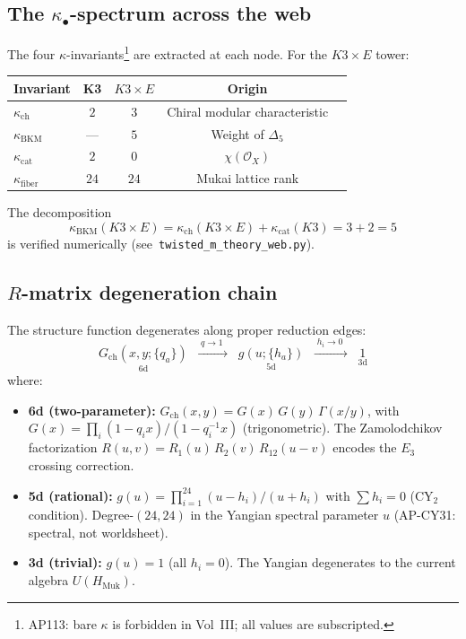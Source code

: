 \subsection{The $\kappa_\bullet$-spectrum across the web}
\label{sec:kappa-spectrum-web}

The four $\kappa$-invariants\footnote{AP113: bare $\kappa$ is forbidden
in Vol~III; all values are subscripted.} are extracted at each node.
For the $K3 \times E$ tower:

\begin{center}
\renewcommand{\arraystretch}{1.3}
\begin{tabular}{lcccc}
\hline
\textbf{Invariant} & \textbf{K3} & \textbf{$K3 \times E$} & \textbf{Origin} \\
\hline
$\kappa_{\mathrm{ch}}$ & $2$ & $3$ & Chiral modular characteristic \\
$\kappa_{\mathrm{BKM}}$ & --- & $5$ & Weight of $\Delta_5$ \\
$\kappa_{\mathrm{cat}}$ & $2$ & $0$ & $\chi(\mathcal{O}_X)$ \\
$\kappa_{\mathrm{fiber}}$ & $24$ & $24$ & Mukai lattice rank \\
\hline
\end{tabular}
\end{center}

\noindent
The decomposition
\begin{equation}
\label{eq:kappa-bkm-decomposition}
  \kappa_{\mathrm{BKM}}(K3 \times E)
    = \kappa_{\mathrm{ch}}(K3 \times E) + \kappa_{\mathrm{cat}}(K3)
    = 3 + 2 = 5
\end{equation}
is verified numerically (see~\texttt{twisted\_m\_theory\_web.py}).

\subsection{$R$-matrix degeneration chain}
\label{sec:rmatrix-degeneration}

The structure function degenerates along proper reduction edges:
\[
  \underset{6\text{d}}{G_{\mathrm{ch}}(x,y;\{q_a\})}
  \;\;\xrightarrow{\;q\to 1\;\;}\;\;
  \underset{5\text{d}}{g(u;\{h_a\})}
  \;\;\xrightarrow{\;h_i\to 0\;\;}\;\;
  \underset{3\text{d}}{1}
\]
where:
\begin{itemize}
\item \textbf{6d (two-parameter):} $G_{\mathrm{ch}}(x,y) = G(x)\,G(y)\,\Gamma(x/y)$,
  with $G(x) = \prod_{i}(1-q_ix)/(1-q_i^{-1}x)$ (trigonometric).
  The Zamolodchikov factorization
  $R(u,v) = R_1(u)\,R_2(v)\,R_{12}(u-v)$
  encodes the $E_3$ crossing correction.
\item \textbf{5d (rational):} $g(u) = \prod_{i=1}^{24}(u - h_i)/(u + h_i)$
  with $\sum h_i = 0$ (CY$_2$ condition).
  Degree-$(24,24)$ in the Yangian spectral parameter $u$
  (AP-CY31: spectral, not worldsheet).
\item \textbf{3d (trivial):} $g(u) = 1$ (all $h_i = 0$).
  The Yangian degenerates to the current algebra $U(H_{\mathrm{Muk}})$.
\end{itemize}

